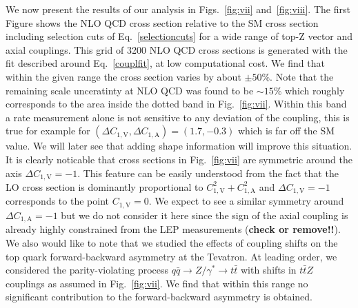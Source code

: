 \documentclass[preprint]{JHEP3} %
\def\ttbZ{t\bar{t}Z}
\def\ttb{t\bar{t}}
\def\ConeA{C_{1,\mathrm{A}}}
\def\ConeV{C_{1,\mathrm{V}}}
\begin{document}
We now present the results of our analysis in Figs.~\ref{fig:vii} and~\ref{fig:viii}.
The first Figure shows the NLO QCD cross section relative to the SM cross section 
including selection cuts of Eq.~\ref{selectioncuts} for a wide range of top-Z vector and axial couplings.
This grid of 3200 NLO QCD cross sections is generated with the fit described around Eq.~\ref{couplfit}, at low computational cost.
We find that within the given range the cross section varies by about $\pm 50\%$.
Note that the remaining scale unceratinty at NLO QCD was found to be $\sim 15\%$ which roughly corresponds to the area inside the dotted band in Fig.~\ref{fig:vii}.
Within this band a rate measurement alone is not sensitive to any deviation of the coupling, this is true for example for $(\Delta\ConeV,\Delta\ConeA)=(1.7,-0.3)$ which is far off the SM value.
We will later see that adding shape information will improve this situation.
It is clearly noticable that cross sections in Fig.~\ref{fig:vii} are symmetric around the axis $\Delta\ConeV=-1$. This feature can be easily understood
from the fact that the LO cross section is dominantly proportional to $\ConeV^2+\ConeA^2$ and $\Delta\ConeV=-1$ corresponds to the point $\ConeV=0$.
We expect to see a similar symmetry around $\Delta\ConeA=-1$ but we do not consider it here since the sign of the axial coupling is already highly constrained from 
the LEP measurements ({\bf check or remove!!}).
We also would like to note that we studied the effects of coupling shifts on the top quark forward-backward asymmetry at the Tevatron.
At leading order, we considered the parity-violating process $q \bar{q} \to Z/\gamma^* \to \ttb$ with shifts in $\ttbZ$ couplings as assumed in Fig.~\ref{fig:vii}.
We find that within this range no significant contribution to the forward-backward asymmetry is obtained.
\end{document}
